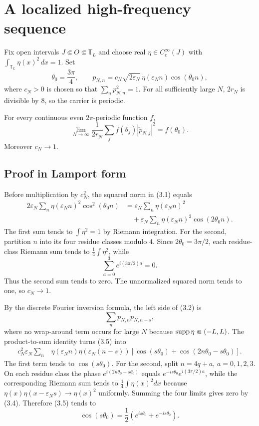 \documentclass[11pt,a4paper]{article}
\newcommand{\T}{\mathbb T}
\newcommand{\eps}{\varepsilon}
\newcommand{\dd}{\,d}
\begin{document}
\section{A localized high-frequency sequence}\label{sec:carrier}

Fix open intervals $J\Subset O\Subset\T_L$ and choose real
$\eta\in C_c^\infty(J)$ with $\int_{\T_L}\eta(x)^2\dd x=1$.
Set
\[
 \theta_0=\frac{3\pi}{4},\qquad
 p_{N,n}=c_N\sqrt{2\eps_N}\,\eta(\eps_Nn)\cos(\theta_0n),        \tag{3.1}
\]
where $c_N>0$ is chosen so that $\sum_n p_{N,n}^2=1$.  For all
sufficiently large $N$, $2r_N$ is divisible by $8$, so the carrier is periodic.

\begin{lemma}\label{lem:carrier}
For every continuous even $2\pi$-periodic function $f$,
\[
 \lim_{N\to\infty}\frac1{2r_N}\sum_j
 f(\theta_j)|\widetilde p_{N,j}|^2=f(\theta_0).                  \tag{3.2}
\]
Moreover $c_N\to1$.
\end{lemma}

\subsection*{Proof in Lamport form}


Before multiplication by $c_N^2$, the squared norm in (3.1) equals
\begin{align}
 2\eps_N\sum_n\eta(\eps_Nn)^2\cos^2(\theta_0n)
 &=\eps_N\sum_n\eta(\eps_Nn)^2\\
 &\quad+\eps_N\sum_n\eta(\eps_Nn)^2\cos(2\theta_0n).           \tag{3.3}
\end{align}
The first sum tends to $\int\eta^2=1$ by Riemann integration.  For the second,
partition $n$ into its four residue classes modulo $4$.  Since
$2\theta_0=3\pi/2$, each residue-class Riemann sum tends to
$\frac14\int\eta^2$, while
\[
 \sum_{a=0}^{3}e^{i(3\pi/2)a}=0.                                \tag{3.4}
\]
Thus the second sum tends to zero.  The unnormalized squared norm tends to one,
so $c_N\to1$.


By the discrete Fourier inversion formula, the left side of (3.2) is
\[
 \sum_np_{N,n}p_{N,n-s},                                        \tag{3.5}
\]
where no wrap-around term occurs for large $N$ because $\operatorname{supp}\eta\Subset(-L,L)$.
The product-to-sum identity turns (3.5) into
\begin{align}
 c_N^2\eps_N\sum_n&\eta(\eps_Nn)\eta(\eps_N(n-s))
 \left[\cos(s\theta_0)+\cos(2n\theta_0-s\theta_0)\right].      \tag{3.6}
\end{align}
The first term tends to $\cos(s\theta_0)$.  For the second, split $n=4q+a$,
$a=0,1,2,3$.  On each residue class the phase
$e^{i(2n\theta_0-s\theta_0)}$ equals
$e^{-is\theta_0}e^{i(3\pi/2)a}$, while the corresponding Riemann sum tends to
$\frac14\int\eta(x)^2dx$ because
$\eta(x)\eta(x-\eps_Ns)\to\eta(x)^2$ uniformly.  Summing the four limits gives
zero by (3.4).
Therefore (3.5) tends to
\[
 \cos(s\theta_0)=\frac12(e^{is\theta_0}+e^{-is\theta_0}).       \tag{3.7}
\]
\end{document}
